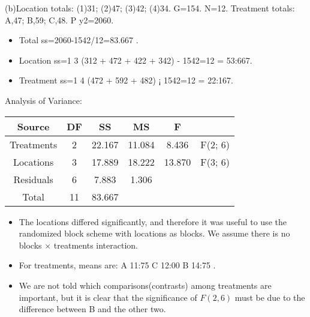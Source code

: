 \documentclass[a4paper,12pt]{article}
\begin{document}
\begin{enumerate}
\newpage
(b)Location totals: (1)31; (2)47; (3)42; (4)34. G=154. N=12.
Treatment totals: A,47; B,59; C,48.
P
y2=2060.
\begin{itemize}
    \item Total ss=2060-1542/12=83.667 .
\item Location ss=1
3 (312 + 472 + 422 + 342) - 1542=12 = 53:667.
\item Treatment ss=1
4 (472 + 592 + 482) ¡ 1542=12 = 22:167.
\end{itemize}


Analysis of Variance:
\begin{center}
\begin{tabular}{|c|c|c|c|c|c|}\hline
Source	&	DF	&	SS	&	MS	&	F &	 \\ \hline \hline
Treatments	&	2	&	22.167	&	11.084	&	8.436	& F(2; 6)\\ \hline
Locations	&	3	&	17.889	&	18.222	&	13.870	& F(3; 6) \\ \hline
Residuals	&	6	&	7.883	&	1.306	&		& \\ \hline
Total	&	11	&	83.667	&		&		& \\ \hline
\end{tabular}
\end{center}

\begin{itemize}
    \item The locations differed significantly, and therefore it was useful to use the randomized block scheme
with locations as blocks. We assume there is no blocks $\times$ treatments interaction.
\item  For treatments, means are: A 11:75
C 12:00
B 14:75
. 
\item We are not told which comparisons(contrasts) among
treatments are important, but it is clear that the significance of $F(2,6)$ must be due to the difference
between B and the other two.
\end{itemize}


\end{enumerate}
\end{document}
